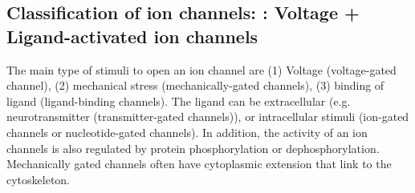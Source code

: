 %
%
%
%
%
%



\subsection{Classification of ion channels: : Voltage + Ligand-activated ion
channels}
\label{sec:class-ion-chann}
\label{sec:voltage-gated-ion-channel}
\label{sec:Voltage-and-Ligand-activated-channels}
\label{sec:Ligand-and-Voltage-activated-channels}

  The main type of stimuli to open an ion channel are (1) Voltage (voltage-gated
  channel), (2) mechanical stress (mechanically-gated channels), (3) binding of
  ligand (ligand-binding channels). The ligand can be extracellular (e.g.
  neurotransmitter (transmitter-gated channels)), or intracellular stimuli
  (ion-gated channels or nucleotide-gated channels). In addition, the activity
  of an ion channels is also regulated by protein phosphorylation or
  dephosphorylation. Mechanically gated channels often have cytoplasmic
  extension that link to the cytoskeleton.


